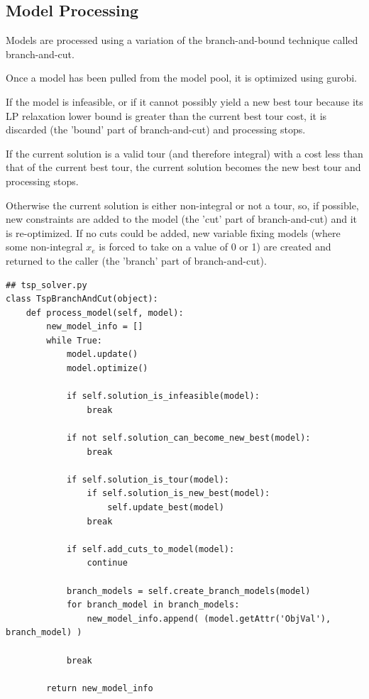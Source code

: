 \documentclass{article}
\begin{document}
\subsection{Model Processing}
\begin{flushleft}

Models are processed
using a variation
of the branch-and-bound
technique
called branch-and-cut.

Once a model has been pulled
from the model pool,
it is optimized using gurobi.

If the model is infeasible,
or if it cannot possibly yield a new best tour
because its LP relaxation lower bound
is greater than the current best tour cost,
it is discarded
(the 'bound' part of branch-and-cut)
and processing stops.

If the current solution
is a valid tour
(and therefore integral)
with a cost less than that
of the current best tour,
the current solution becomes the new best tour
and processing stops.

Otherwise the current solution
is either non-integral or not a tour,
so, if possible, new constraints
are added to the model
(the 'cut' part of branch-and-cut)
and it is re-optimized.
If no cuts could be added,
new variable fixing models
(where some non-integral $x_e$
is forced to take on a value of 0 or 1)
are created
and returned to the caller
(the 'branch' part of branch-and-cut).

\begin{lstlisting}
## tsp_solver.py
class TspBranchAndCut(object):
    def process_model(self, model):
        new_model_info = []
        while True:
            model.update()
            model.optimize()

            if self.solution_is_infeasible(model):
                break

            if not self.solution_can_become_new_best(model):
                break

            if self.solution_is_tour(model):
                if self.solution_is_new_best(model):
                    self.update_best(model)
                break

            if self.add_cuts_to_model(model):
                continue

            branch_models = self.create_branch_models(model)
            for branch_model in branch_models:
                new_model_info.append( (model.getAttr('ObjVal'), branch_model) )

            break

        return new_model_info
\end{lstlisting}

\end{flushleft}
\end{document}
